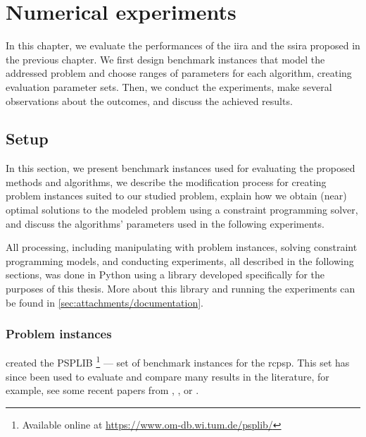 \chapter{Numerical experiments} \label{chap:numerical-experiments}

In this chapter,
we evaluate the performances of the \acl{iira} and the \acl{ssira} proposed in the previous chapter.
We first design benchmark instances that model the addressed problem
and choose ranges of parameters for each algorithm,
creating evaluation parameter sets.
Then, we conduct the experiments, make several observations about the outcomes,
and discuss the achieved results.

\section{Setup} \label{sec:numerical-experiments/setup}

In this section, we present benchmark instances used for evaluating the proposed methods and algorithms,
we describe the modification process for creating problem instances suited to our studied problem,
explain how we obtain (near) optimal solutions to the modeled problem using a constraint programming solver,
and discuss the algorithms' parameters used in the following experiments.

All processing, including manipulating with problem instances, solving constraint programming models,
and conducting experiments, all described in the following sections, was done in Python using a library
developed specifically for the purposes of this thesis.
More about this library and running the experiments can be found in \cref{sec:attachments/documentation}.

\subsection{Problem instances} \label{subsec:numerical-experiments/setup/instances}

\citet{Kolisch1997} created the PSPLIB%
\footnote{Available online at \url{https://www.om-db.wi.tum.de/psplib/}}
--- set of benchmark instances for the \ac{rcpsp}.
This set has since been used to evaluate and compare many results in the literature,
for example, see some recent papers from \citet{Bianco2011}, \citet{Cheng2015}, or \citet{Elsayed2017}.

